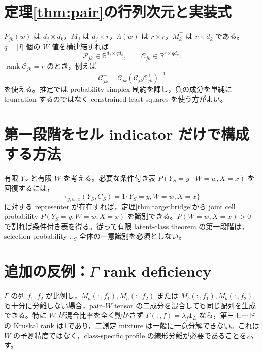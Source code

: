 \documentclass[11pt,a4paper]{ltjsarticle}
\theoremstyle{remark}\newtheorem{remark}{注意}[section]
\newcommand{\R}{\mathbb R}
\newcommand{\rank}{\operatorname{rank}}
\newcommand{\one}{\bm 1}
\begin{document}
\appendix
\section{定理\ref{thm:pair}の行列次元と実装式}
$P_{jk}(w)$ は $d_j\times d_k$，$M_j$ は $d_j\times r$，$\Lambda(w)$ は $r\times r$，$M_k^\top$ は $r\times d_k$ である。$q=|I|$ 個の $W$ 値を横連結すれば
\[
\mathcal P_{jk}\in\R^{d_j\times qd_k},\qquad
\mathcal C_{jk}\in\R^{r\times qd_k}.
\]
$\rank\mathcal C_{jk}=r$ のとき，例えば
\[
\mathcal C_{jk}^+
=\mathcal C_{jk}^\top
(\mathcal C_{jk}\mathcal C_{jk}^\top)^{-1}
\]
を使える。推定では probability simplex 制約を課し，負の成分を単純に truncation するのではなく constrained least squares を使う方がよい。

\section{第一段階をセル indicator だけで構成する方法}
有限 $Y_S$ と有限 $W$ を考える。必要な条件付き表 $P(Y_S=y\mid W=w,X=x)$ を回復するには，
\[
\tau_{y,w,x}(Y_S,C_S)=1\{Y_S=y,W=w,X=x\}
\]
に対する representer が存在すれば，定理\ref{thm:targetbridge}から joint cell probability
$P(Y_S=y,W=w,X=x)$ を識別できる。$P(W=w,X=x)>0$ で割れば条件付き表を得る。従って有限 latent-class theorem の第一段階は，selection probability $\pi_S$ 全体の一意識別を必須としない。

\section{追加の反例：$\Gamma$ rank deficiency}
$\Gamma$ の列 $f_1,f_2$ が比例し，$M_a(:,f_1),M_a(:,f_2)$ または $M_b(:,f_1),M_b(:,f_2)$ も十分に分離しない場合，pair--$W$ tensor の二成分を混合しても同じ配列を生成できる。特に $W$ が混合比率を全く動かさず $\Gamma(:,f)=\lambda_f\one_L$ なら，第三モードの Kruskal rank は1であり，二測定 mixture は一般に一意分解できない。これは $W$ の予測精度ではなく，class-specific profile の線形分離が必要であることを示す。
\end{document}
